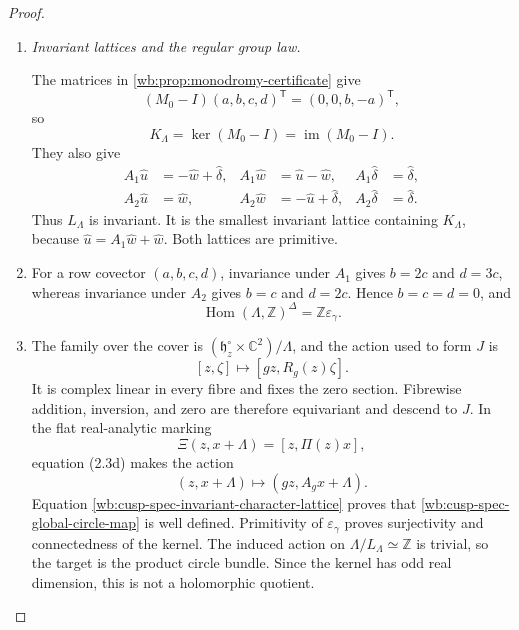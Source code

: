 \begin{proof}
\begin{enumerate}[label=\arabic*.,leftmargin=*]
\item \medskip\noindent\emph{Invariant lattices and the regular group law.}\par
The matrices in \cref{wb:prop:monodromy-certificate} give
\[
 (M_0-I)(a,b,c,d)^{\mathsf T}=(0,0,b,-a)^{\mathsf T},
\]
so
\begin{equation}
 K_\Lambda=\ker(M_0-I)=\operatorname{im}(M_0-I).
 \label{wb:cusp-spec-cusp-kernel}
\end{equation}
They also give
\begin{equation}
 \begin{aligned}
 A_1\widehat u&=-\widehat w+\widehat\delta,&
 A_1\widehat w&=\widehat u-\widehat w,&
 A_1\widehat\delta&=\widehat\delta,\\
 A_2\widehat u&=\widehat w,&
 A_2\widehat w&=-\widehat u+\widehat\delta,&
 A_2\widehat\delta&=\widehat\delta.
 \end{aligned}
 \label{wb:cusp-spec-invariant-flag-calculation}
\end{equation}
Thus \(L_\Lambda\) is invariant.  It is the smallest invariant lattice
containing \(K_\Lambda\), because
\(\widehat u=A_1\widehat w+\widehat w\).  Both lattices are primitive.

\item For a row covector \((a,b,c,d)\), invariance under \(A_1\) gives
\(b=2c\) and \(d=3c\), whereas invariance under \(A_2\) gives
\(b=c\) and \(d=2c\).  Hence \(b=c=d=0\), and
\begin{equation}
 \operatorname{Hom}(\Lambda,\mathbb Z)^\Delta
 =\mathbb Z\varepsilon_\gamma.
 \label{wb:cusp-spec-invariant-character-lattice}
\end{equation}

\item The family over the cover is
\((\mathfrak h_z^\circ\times\mathbb C^2)/\Lambda\), and the action used
to form \(J\) is
\[
 [z,\zeta]\longmapsto[gz,R_g(z)\zeta].
\]
It is complex linear in every fibre and fixes the zero section.
Fibrewise addition, inversion, and zero are therefore equivariant and
descend to \(J\).  In the flat real-analytic marking
\[
 \Xi(z,x+\Lambda)=[z,\Pi(z)x],
\]
equation (2.3d) makes the action
\[
 (z,x+\Lambda)\longmapsto(gz,A_gx+\Lambda).
\]
Equation \cref{wb:cusp-spec-invariant-character-lattice} proves that
\cref{wb:cusp-spec-global-circle-map} is well defined.  Primitivity of
\(\varepsilon_\gamma\) proves surjectivity and connectedness of the
kernel.  The induced action on \(\Lambda/L_\Lambda\simeq\mathbb Z\) is
trivial, so the target is the product circle bundle.  Since the kernel has
odd real dimension, this is not a holomorphic quotient.


\end{enumerate}
\end{proof}
